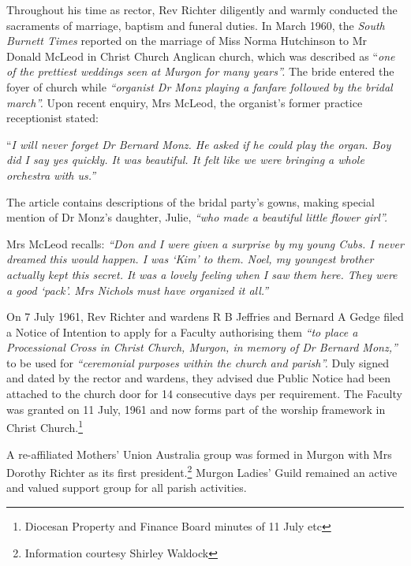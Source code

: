 Throughout his time as rector, Rev Richter diligently and warmly conducted the sacraments of marriage, baptism and funeral duties. In March 1960, the \emph{South Burnett Times} reported on the marriage of Miss Norma Hutchinson to Mr Donald McLeod in Christ Church Anglican church, which was described as ``\emph{one of the prettiest weddings seen at Murgon for many years''.} The bride entered the foyer of church while \emph{``organist Dr Monz playing a fanfare followed by the bridal march''.} Upon recent enquiry, Mrs McLeod, the organist's former practice receptionist stated:



``\emph{I will never forget Dr Bernard Monz. He asked if he could play the organ. Boy did I say yes quickly. It was beautiful. It felt like we were bringing a whole orchestra with us.''}



The article contains descriptions of the bridal party's gowns, making special mention of Dr Monz's daughter, Julie, \emph{``who made a beautiful little flower girl''.}



Mrs McLeod recalls: \emph{``Don and I were given a surprise by my young Cubs. I never dreamed this would happen. I was `Kim' to them. Noel, my youngest brother actually kept this secret. It was a lovely feeling when I saw them here. They were a good `pack'. Mrs Nichols must have organized it all.''}



On 7 July 1961, Rev Richter and wardens R B Jeffries and Bernard A Gedge filed a Notice of Intention to apply for a Faculty authorising them \emph{``to place a Processional Cross in Christ Church, Murgon, in memory of Dr Bernard Monz,''} to be used for \emph{``ceremonial purposes within the church and parish''.} Duly signed and dated by the rector and wardens, they advised due Public Notice had been attached to the church door for 14 consecutive days per requirement. The Faculty was granted on 11 July, 1961 and now forms part of the worship framework in Christ Church.\footnote{Diocesan Property and Finance Board minutes of 11 July etc}


A re-affiliated Mothers' Union Australia group was formed in Murgon with Mrs Dorothy Richter as its first president.\footnote{Information courtesy Shirley Waldock} Murgon Ladies' Guild remained an active and valued support group for all parish activities.


